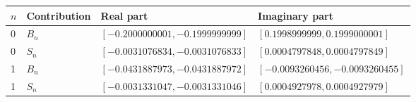 \begin{tabular}{@{}llll@{}}
\toprule
$n$ & Contribution & Real part & Imaginary part \\
\midrule
0 & $B_n$ & $[-0.2000000001, -0.1999999999]$ & $[0.1998999999, 0.1999000001]$ \\
0 & $S_n$ & $[-0.0031076834, -0.0031076833]$ & $[0.0004797848, 0.0004797849]$ \\
1 & $B_n$ & $[-0.0431887973, -0.0431887972]$ & $[-0.0093260456, -0.0093260455]$ \\
1 & $S_n$ & $[-0.0031331047, -0.0031331046]$ & $[0.0004927978, 0.0004927979]$ \\
\bottomrule
\end{tabular}
